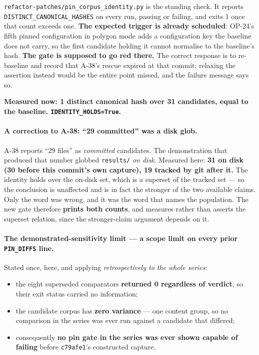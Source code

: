 \documentclass[
  10pt,
]{article}
\providecommand{\tightlist}{%
  \setlength{\itemsep}{0pt}\setlength{\parskip}{0pt}}
\begin{document}
\texttt{refactor-patches/\allowbreak{}pin\_corpus\_identity.py} is the standing check. It reports \texttt{DISTINCT\_CANONICAL\_HASHES} on every run, passing or failing, and exits 1 once that count exceeds one. \textbf{The expected trigger is already scheduled}: OP-24's fifth pinned configuration in polygon mode adds a configuration key the baseline does not carry, so the first candidate holding it cannot normalise to the baseline's hash. \textbf{The gate is supposed to go red there.} The correct response is to re-baseline and record that A-38's rescue expired at that commit; relaxing the assertion instead would be the entire point missed, and the failure message says so.

\textbf{Measured now: 1 distinct canonical hash over 31 candidates, equal to the baseline. \texttt{IDENTITY\_HOLDS=True}.}

\paragraph{A correction to A-38: ``29 committed'' was a disk glob.}
A-38 reports ``29 files'' as \emph{committed} candidates. The demonstration that produced that number globbed \texttt{results/} \emph{on disk}. Measured here: \textbf{31 on disk (30 before this commit's own capture), 19 tracked by git after it.} The identity holds over the on-disk set, which is a superset of the tracked set --- so the conclusion is unaffected and is in fact the stronger of the two available claims. Only the word was wrong, and it was the word that names the population. The new gate therefore \textbf{prints both counts}, and measures rather than asserts the superset relation, since the stronger-claim argument depends on it.

\paragraph{The demonstrated-sensitivity limit --- a scope limit on every prior \texttt{PIN\_DIFFS} line.}
Stated once, here, and applying \emph{retrospectively to the whole series}:

\begin{itemize}
\tightlist
\item the eight superseded comparators \textbf{returned 0 regardless of verdict}, so their exit status carried no information;
\item the candidate corpus has \textbf{zero variance} --- one content group, so no comparison in the series was ever run against a candidate that differed;
\item consequently \textbf{no pin gate in the series was ever shown capable of failing} before \texttt{c79afe1}'s constructed capture.
\end{itemize}
\end{document}
